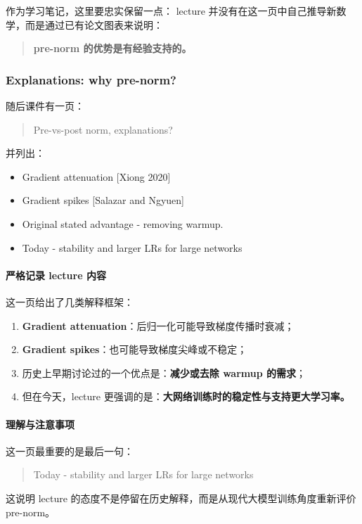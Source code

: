 \documentclass[a4paper,UTF8]{article}
\numberwithin{equation}{section}
\begin{document}
作为学习笔记，这里要忠实保留一点：  
lecture 并没有在这一页中自己推导新数学，而是通过已有论文图表来说明：
\begin{quote}
\textbf{pre-norm 的优势是有经验支持的。}
\end{quote}

\subsubsection{Explanations: why pre-norm?}

随后课件有一页：
\begin{quote}
Pre-vs-post norm, explanations?
\end{quote}

并列出：
\begin{itemize}
    \item Gradient attenuation [Xiong 2020]
    \item Gradient spikes [Salazar and Ngyuen]
    \item Original stated advantage - removing warmup.
    \item Today - stability and larger LRs for large networks
\end{itemize}

\paragraph{严格记录 lecture 内容}
这一页给出了几类解释框架：

\begin{enumerate}
    \item \textbf{Gradient attenuation}：后归一化可能导致梯度传播时衰减；
    \item \textbf{Gradient spikes}：也可能导致梯度尖峰或不稳定；
    \item 历史上早期讨论过的一个优点是：\textbf{减少或去除 warmup 的需求}；
    \item 但在今天，lecture 更强调的是：\textbf{大网络训练时的稳定性与支持更大学习率。}
\end{enumerate}

\paragraph{理解与注意事项}
这一页最重要的是最后一句：
\begin{quote}
Today - stability and larger LRs for large networks
\end{quote}

这说明 lecture 的态度不是停留在历史解释，而是从现代大模型训练角度重新评价 pre-norm。
\end{document}
